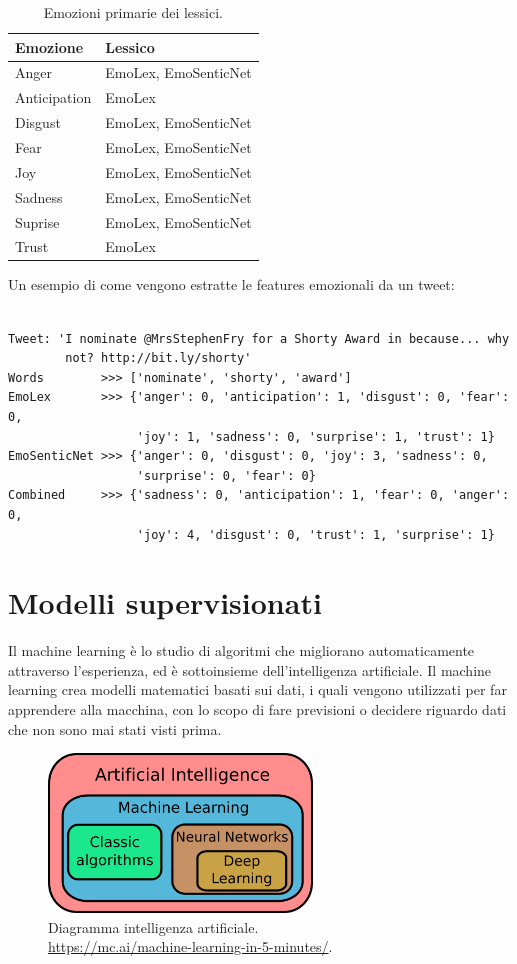 \documentclass[oneside]{book}
\begin{document}
\begin{table}[h!]
	\centering
	\begin{tabular}[t]{l|l}
		\hline
		\textbf{Emozione} & \textbf{Lessico} \\
		\hline
		Anger			& EmoLex, EmoSenticNet \\
		Anticipation	& EmoLex \\
		Disgust			& EmoLex, EmoSenticNet \\
		Fear			& EmoLex, EmoSenticNet \\
		Joy				& EmoLex, EmoSenticNet \\
		Sadness			& EmoLex, EmoSenticNet \\
		Suprise			& EmoLex, EmoSenticNet \\
		Trust			& EmoLex \\
		\hline
	\end{tabular}
	\caption{Emozioni primarie dei lessici.}
\end{table}


Un esempio di come vengono estratte le features emozionali da un tweet:

\begin{lstlisting}[caption={Esempio di estrazione delle emozioni da un tweet.}]

Tweet: 'I nominate @MrsStephenFry for a Shorty Award in because... why
        not? http://bit.ly/shorty'
Words	     >>> ['nominate', 'shorty', 'award']
EmoLex       >>> {'anger': 0, 'anticipation': 1, 'disgust': 0, 'fear': 0,
                  'joy': 1, 'sadness': 0, 'surprise': 1, 'trust': 1}
EmoSenticNet >>> {'anger': 0, 'disgust': 0, 'joy': 3, 'sadness': 0,
                  'surprise': 0, 'fear': 0}
Combined     >>> {'sadness': 0, 'anticipation': 1, 'fear': 0, 'anger': 0,
                  'joy': 4, 'disgust': 0, 'trust': 1, 'surprise': 1}
\end{lstlisting}

\section{Modelli supervisionati}
Il machine learning è lo studio di algoritmi che migliorano automaticamente attraverso l'esperienza, ed è sottoinsieme dell'intelligenza artificiale. Il machine learning crea modelli matematici basati sui dati, i quali vengono utilizzati per far apprendere alla macchina, con lo scopo di fare previsioni o decidere riguardo dati che non sono mai stati visti prima.


\begin{figure}[!h]
	\centering
	\includegraphics[width=7cm]{assets/ai_diagram.png}
	\caption{Diagramma intelligenza artificiale. \\ \url{https://mc.ai/machine-learning-in-5-minutes/}.}
	\label{fig:artificial-intelligence}
\end{figure}
\end{document}
